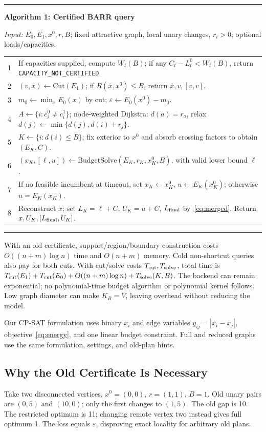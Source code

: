 \documentclass[conference]{IEEEtran}
\newcounter{barralgorithm}
\newcommand{\eps}{\varepsilon}
\begin{document}
\smallskip\noindent\begin{minipage}{\columnwidth}
\small\hrule\medskip
{}\label{alg:barr}
\textbf{Algorithm 1: Certified BARR query}\par
\textit{Input:} $E_0,E_1,x^0,r,B$; fixed attractive graph, local unary changes, $r_i>0$; optional loads/capacities.\par
\begin{tabular}{@{}r p{}@{}}
1 & If capacities supplied, compute $W_t(B)$; if any $C_t-L_t^0<W_t(B)$, return \texttt{CAPACITY\_NOT\_CERTIFIED}.\\
2 & $(v,\bar x)\gets\mathrm{Cut}(E_1)$; if $R(\bar x,x^0)\le B$, return $\bar x,v,[v,v]$.\\
3 & $m_0\gets\min_x E_0(x)$ by cut; $\eps\gets E_0(x^0)-m_0$.\\
4 & $A\gets\{i:c_i^0\ne c_i^1\}$; node-weighted Dijkstra: $d(a)=r_a$, relax $d(j)\gets\min\{d(j),d(i)+r_j\}$.\\
5 & $K\gets\{i:d(i)\le B\}$; fix exterior to $x^0$ and absorb crossing factors to obtain $(E_K,C)$.\\
6 & $(x_K,[\ell,u])\gets\mathrm{BudgetSolve}(E_K,r_K,x_K^0,B)$, with valid lower bound $\ell$.\\
7 & If no feasible incumbent at timeout, set $x_K\gets x_K^0$, $u\gets E_K(x_K^0)$; otherwise $u=E_K(x_K)$.\\
8 & Reconstruct $x$; set $L_K=\ell+C$, $U_K=u+C$, $L_{\rm final}$ by~\eqref{eq:merged}. Return $x,U_K,[L_{\rm final},U_K]$.\\
\end{tabular}
\medskip\hrule
\end{minipage}\smallskip

With an old certificate, support/region/boundary construction costs $O((n+m)\log n)$ time and $O(n+m)$ memory. Cold non-shortcut queries also pay for both cuts. With cut/solve costs $T_{\rm cut},T_{\rm solve}$, total time is $T_{\rm cut}(E_1)+T_{\rm cut}(E_0)+O((n+m)\log n)+T_{\rm solve}(K,B)$. The backend can remain exponential; no polynomial-time budget algorithm or polynomial kernel follows. Low graph diameter can make $K_B=V$, leaving overhead without reducing the model.

Our CP-SAT formulation uses binary $x_i$ and edge variables $y_{ij}=|x_i-x_j|$, objective~\eqref{eq:energy}, and one linear budget constraint. Full and reduced graphs use the same formulation, settings, and old-plan hints. 

\subsection{Why the Old Certificate Is Necessary}
Take two disconnected vertices, $x^0=(0,0)$, $r=(1,1)$, $B=1$. Old unary pairs are $(0,5)$ and $(10,0)$; only the first changes to $(1,5)$. The old gap is 10. The restricted optimum is 11; changing remote vertex two instead gives full optimum 1. The loss equals $\eps$, disproving exact locality for arbitrary old plans.
\end{document}
